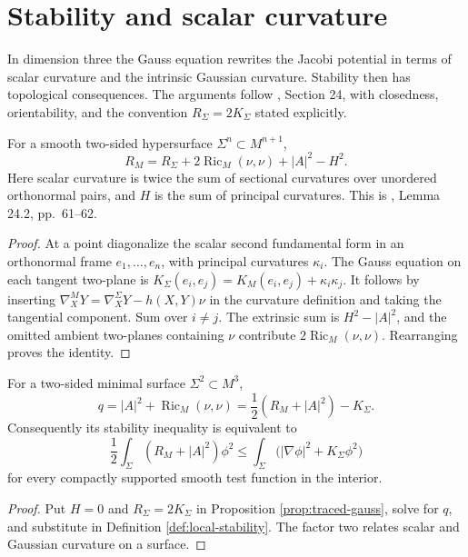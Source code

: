 \chapter{Stability and scalar curvature}\label{sec:stability-scalar-curvature}
In dimension three the Gauss equation rewrites the Jacobi potential in terms of scalar curvature and the intrinsic Gaussian curvature. Stability then has topological consequences. The arguments follow \cite{ChMin}, Section 24, with closedness, orientability, and the convention $R_\Sigma=2K_\Sigma$ stated explicitly.

\begin{proposition}\label{prop:traced-gauss}
For a smooth two-sided hypersurface $\Sigma^n\subset M^{n+1}$,
\[
 R_M=R_\Sigma+2\operatorname{Ric}_M(\nu,\nu)+|A|^2-H^2.
\]
Here scalar curvature is twice the sum of sectional curvatures over unordered orthonormal pairs, and $H$ is the sum of principal curvatures. This is \cite{ChMin}, Lemma 24.2, pp.~61--62.
\end{proposition}
\begin{proof}
At a point diagonalize the scalar second fundamental form in an orthonormal frame $e_1,\ldots,e_n$, with principal curvatures $\kappa_i$. The Gauss equation on each tangent two-plane is
$K_\Sigma(e_i,e_j)=K_M(e_i,e_j)+\kappa_i\kappa_j$.
It follows by inserting $\nabla^M_XY=\nabla^\Sigma_XY-h(X,Y)\nu$ in the curvature definition and taking the tangential component. Sum over $i\ne j$. The extrinsic sum is $H^2-|A|^2$, and the omitted ambient two-planes containing $\nu$ contribute $2\operatorname{Ric}_M(\nu,\nu)$. Rearranging proves the identity.
\end{proof}

\begin{corollary}\label{cor:surface-jacobi-gauss}
For a two-sided minimal surface $\Sigma^2\subset M^3$,
\[
 q=|A|^2+\operatorname{Ric}_M(\nu,\nu)
 =\frac12(R_M+|A|^2)-K_\Sigma.
\]
Consequently its stability inequality is equivalent to
\[
 \frac12\int_\Sigma(R_M+|A|^2)\phi^2
 \leq\int_\Sigma\bigl(|\nabla\phi|^2+K_\Sigma\phi^2\bigr)
\]
for every compactly supported smooth test function in the interior.
\end{corollary}
\begin{proof}
Put $H=0$ and $R_\Sigma=2K_\Sigma$ in Proposition \ref{prop:traced-gauss}, solve for $q$, and substitute in Definition \ref{def:local-stability}. The factor two relates scalar and Gaussian curvature on a surface.
\end{proof}

